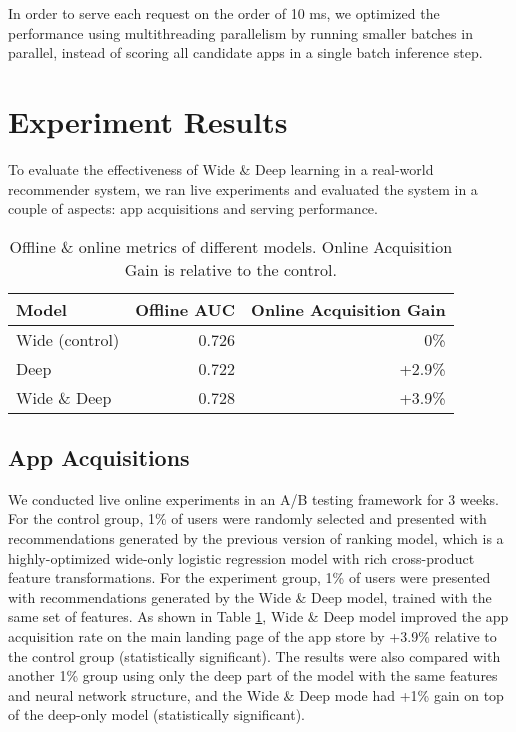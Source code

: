 \documentclass{sig-alternate-05-2015}
\begin{document}
In order to serve each request on the order of 10 ms, we optimized the performance using multithreading parallelism by running smaller batches in parallel, instead of scoring all candidate apps in a single batch inference step.

\section{Experiment Results}
To evaluate the effectiveness of Wide \& Deep learning in a real-world recommender system, we ran live experiments and evaluated the system in a couple of aspects: app acquisitions and serving performance.

\begin{table}
\caption{Offline \& online metrics of different models. Online Acquisition Gain is relative to the control.}
\label{tab:AppAcquisition}
\begin{tabular}{lrr}
\toprule
Model & Offline AUC & Online Acquisition Gain \\ \toprule
Wide (control) & 0.726 & 0\% \\ \midrule
Deep  & 0.722 &  +2.9\%  \\ \midrule
Wide \& Deep  & 0.728 & +3.9\%  \\ \bottomrule
\end{tabular}
\vspace{-13pt}
\end{table}

\subsection{App Acquisitions}
We conducted live online experiments in an A/B testing framework for 3 weeks. For the control group, 1\% of users were randomly selected and presented with recommendations generated by the previous version of ranking model, which is a highly-optimized wide-only logistic regression model with rich cross-product feature transformations. For the experiment group, 1\% of users were presented with recommendations generated by the Wide \& Deep model, trained with the same set of features. As shown in Table \ref{tab:AppAcquisition}, Wide \& Deep model improved the app acquisition rate on the main landing page of the app store by +3.9\% relative to the control group (statistically significant). The results were also compared with another 1\% group using only the deep part of the model with the same features and neural network structure, and the Wide \& Deep mode had +1\% gain on top of the deep-only model (statistically significant). 
\end{document}
